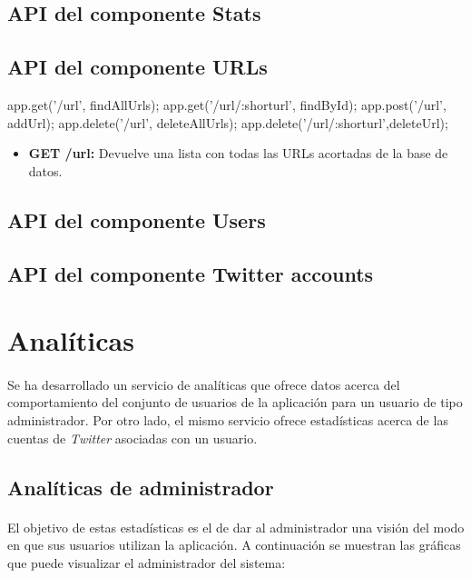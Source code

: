 \documentclass[a4paper]{article}
\begin{document}
	\subsection{API del componente Stats}
	
	\subsection{API del componente URLs}
	app.get('/url', findAllUrls);
	app.get('/url/:shorturl', findById);
	app.post('/url', addUrl);
	app.delete('/url', deleteAllUrls);
	app.delete('/url/:shorturl',deleteUrl);
	\begin{itemize}
		\item \textbf{GET /url:} Devuelve una lista con todas las URLs acortadas de la base de datos.
	\end{itemize}
	
	\subsection{API del componente Users}
	
	\subsection{API del componente Twitter accounts}
\section{Analíticas}

	\paragraph{} Se ha desarrollado un servicio de analíticas que ofrece datos acerca del comportamiento del conjunto de usuarios de la aplicación para un usuario de tipo administrador. Por otro lado, el mismo servicio ofrece estadísticas acerca de las cuentas de \textit{Twitter} asociadas con un usuario.
	
	\subsection{Analíticas de administrador}
	
		\paragraph{} El objetivo de estas estadísticas es el de dar al administrador una visión del modo en que sus usuarios utilizan la aplicación. A continuación se muestran las gráficas que puede visualizar el administrador del sistema:
		
\end{document}

